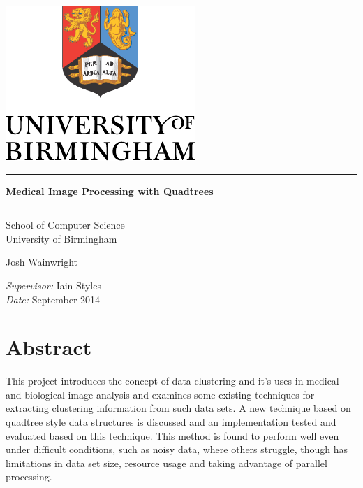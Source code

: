 
\begin{titlepage}
	\begin{center}
		\vspace*{\fill}

		\centering
		\includegraphics[scale=1.0]{Logo.pdf}
		\vfill

		\hrule
		{\LARGE\bf Medical Image Processing with Quadtrees\\[0.4cm]}
		\hrule

		\vfill
		\large
		School of Computer Science\\
		University of Birmingham

		\vfill
		Josh Wainwright
		\vfill

		\vfill
		\textit{Supervisor:} Iain Styles \\
		\vfill
		\textit{Date:} September 2014
		\vfill
		\vfill

	\end{center}
\end{titlepage}
\restoregeometry%

\thispagestyle{empty}
\cleardoublepage%

\thispagestyle{empty}


\part*{Abstract}
\label{prt:abstract}

This project introduces the concept of data clustering and it's uses in medical
and biological image analysis and examines some existing techniques for
extracting clustering information from such data sets. A new technique based on
quadtree style data structures is discussed and an implementation tested and
evaluated based on this technique. This method is found to perform well even
under difficult conditions, such as noisy data, where others struggle, though
has limitations in data set size, resource usage and taking advantage of
parallel processing.

